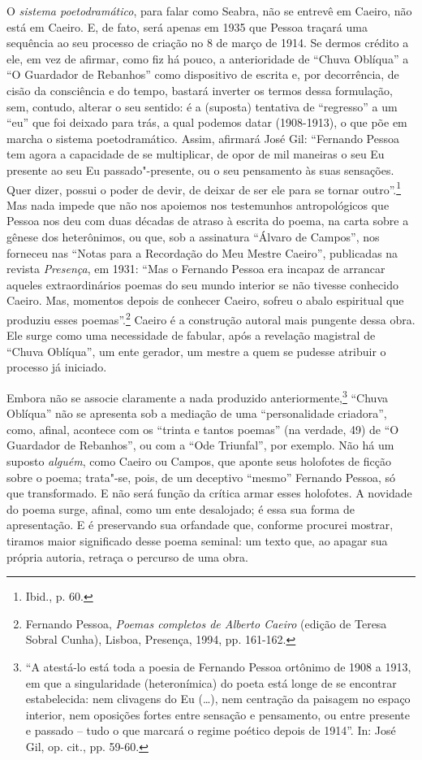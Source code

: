 O \emph{sistema poetodramático}, para falar como Seabra, não se entrevê
em Caeiro, não está em Caeiro. E, de fato, será apenas em 1935 que
Pessoa traçará uma sequência ao seu processo de criação no 8 de março de
1914. Se dermos crédito a ele, em vez de afirmar, como fiz há pouco, a
anterioridade de ``Chuva Oblíqua'' a ``O Guardador de Rebanhos'' como
dispositivo de escrita e, por decorrência, de cisão da consciência e do
tempo, bastará inverter os termos dessa formulação, sem, contudo,
alterar o seu sentido: é a (suposta) tentativa de ``regresso'' a um
``eu'' que foi deixado para trás, a qual podemos datar (1908-1913), o
que põe em marcha o sistema poetodramático. Assim, afirmará José Gil:
``Fernando Pessoa tem agora a capacidade de se multiplicar, de opor de
mil maneiras o seu Eu presente ao seu Eu passado"-presente, ou o seu
pensamento às suas sensações. Quer dizer, possui o poder de devir, de
deixar de ser ele para se tornar outro''.\footnote{Ibid., p. 60.} Mas
nada impede que não nos apoiemos nos testemunhos antropológicos que
Pessoa nos deu com duas décadas de atraso à escrita do poema, na carta
sobre a gênese dos heterônimos, ou que, sob a assinatura ``Álvaro de
Campos'', nos forneceu nas ``Notas para a Recordação do Meu Mestre
Caeiro'', publicadas na revista \emph{Presença}, em 1931: ``Mas o
Fernando Pessoa era incapaz de arrancar aqueles extraordinários poemas
do seu mundo interior se não tivesse conhecido Caeiro. Mas, momentos
depois de conhecer Caeiro, sofreu o abalo espiritual que produziu esses
poemas''.\footnote{Fernando Pessoa, \emph{Poemas completos de Alberto
  Caeiro} (edição de Teresa Sobral Cunha), Lisboa, Presença, 1994, pp.
  161-162.} Caeiro é a construção autoral mais pungente dessa obra. Ele
surge como uma necessidade de fabular, após a revelação magistral de
``Chuva Oblíqua'', um ente gerador, um mestre a quem se pudesse atribuir
o processo já iniciado.

Embora não se associe claramente a nada produzido
anteriormente,\footnote{``A atestá-lo está toda a poesia de Fernando
  Pessoa ortônimo de 1908 a 1913, em que a singularidade (heteronímica)
  do poeta está longe de se encontrar estabelecida: nem clivagens do Eu
  (\ldots{}), nem centração da paisagem no espaço interior, nem oposições
  fortes entre sensação e pensamento, ou entre presente e passado --
  tudo o que marcará o regime poético depois de 1914''. In: José Gil,
  op. cit., pp. 59-60.} ``Chuva Oblíqua'' não se apresenta sob a
mediação de uma ``personalidade criadora'', como, afinal, acontece com
os ``trinta e tantos poemas'' (na verdade, 49) de ``O Guardador de
Rebanhos'', ou com a ``Ode Triunfal'', por exemplo. Não há um suposto
\emph{alguém}, como Caeiro ou Campos, que aponte seus holofotes de
ficção sobre o poema; trata"-se, pois, de um deceptivo ``mesmo'' Fernando
Pessoa, só que transformado. E não será função da crítica armar esses
holofotes. A novidade do poema surge, afinal, como um ente desalojado; é
essa sua forma de apresentação. E é preservando sua orfandade que,
conforme procurei mostrar, tiramos maior significado desse poema
seminal: um texto que, ao apagar sua própria autoria, retraça o percurso
de uma obra.

